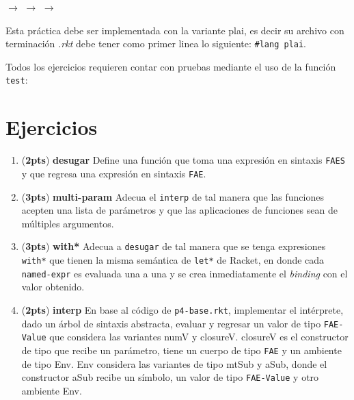 \documentclass{article}
\newcommand{\grade}[1]{(\textbf{#1pts}) }
\begin{document}
\begin{center}
 $\rightarrow$
 $\rightarrow$
 $\rightarrow$
\end{center}

Esta práctica debe ser implementada con la variante plai, es decir
su archivo con terminación \textit{.rkt} debe tener como primer linea lo siguiente:
\texttt{\#lang plai}.

Todos los ejercicios requieren contar con pruebas mediante el uso de
la función \texttt{test}:

\section{Ejercicios}

\begin{enumerate}

\item \grade{2} \textbf{desugar} Define una función que toma una expresión en sintaxis \texttt{FAES} y que regresa una expresión en sintaxis \texttt{FAE}.

\item \grade{3} \textbf{multi-param} Adecua el \texttt{interp} de tal manera que las funciones acepten una lista de parámetros y que las aplicaciones de funciones sean de múltiples argumentos.

\item \grade{3} \textbf{with*} Adecua a \texttt{desugar} de tal manera que se tenga expresiones \texttt{with*} que tienen la misma semántica de \texttt{let*} de Racket, en donde cada \texttt{named-expr} es evaluada una a una y se crea inmediatamente el \textit{binding} con el valor obtenido.

\item \grade{2} \textbf{interp} En base al código de \texttt{p4-base.rkt}, implementar el intérprete, dado un árbol de sintaxis abstracta, evaluar y regresar un valor de tipo \texttt{FAE-Value} que considera las variantes numV y closureV. closureV es el constructor de tipo que recibe un parámetro, tiene un cuerpo de tipo \texttt{FAE} y un ambiente de tipo Env. Env considera las variantes de tipo mtSub y aSub, donde el constructor aSub recibe un símbolo, un valor de tipo \texttt{FAE-Value} y otro ambiente Env.

\end{enumerate}
\end{document}
